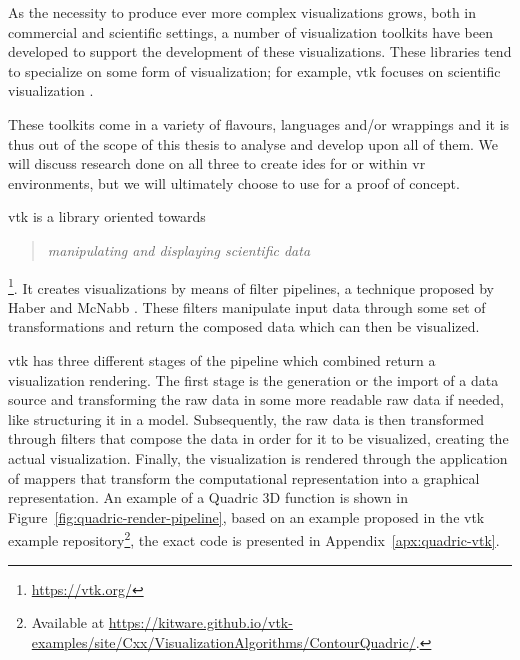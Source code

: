 As the necessity to produce ever more complex visualizations grows, both in commercial and scientific settings, a number of visualization toolkits have been developed to support the development of these visualizations. These libraries tend to specialize on some form of visualization; for example, \acrfull{vtk} focuses on scientific visualization \cite{kruis_creating_2017}.

These toolkits come in a variety of flavours, languages and/or wrappings and it is thus out of the scope of this thesis to analyse and develop upon all of them. We will discuss research done on all three to create \acrshort{ide}s for or within \acrshort{vr} environments, but we will ultimately choose to use for a proof of concept.

\acrfull{vtk} is a library oriented towards \blockquote{\textit{manipulating and displaying scientific data}}\footnote{\url{https://vtk.org/}}. It creates visualizations by means of filter pipelines, a technique proposed by Haber and McNabb \cite{haber1990visualization}. These filters manipulate input data through some set of transformations and return the composed data which can then be visualized. 

\acrshort{vtk} has three different stages of the pipeline which combined return a visualization rendering. The first stage is the generation or the import of a data source and transforming the raw data in some more readable raw data if needed, like structuring it in a model. Subsequently, the raw data is then transformed through filters that compose the data in order for it to be visualized, creating the actual visualization. Finally, the visualization is rendered through the application of mappers that transform the computational representation into a graphical representation. An example of a Quadric 3D function is shown in Figure~\ref{fig:quadric-render-pipeline}, based on an example proposed in the \acrshort{vtk} example repository\footnote{Available at \url{https://kitware.github.io/vtk-examples/site/Cxx/VisualizationAlgorithms/ContourQuadric/}.}, the exact code is presented in Appendix~\ref{apx:quadric-vtk}.

